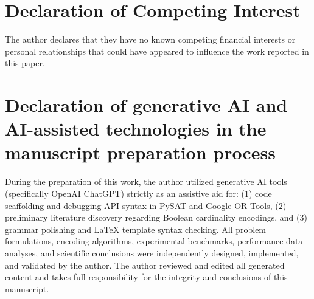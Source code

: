 \documentclass[a4paper,fleqn]{cas-sc}
\begin{document}
\section*{Declaration of Competing Interest}
The author declares that they have no known competing financial interests or personal relationships that could have appeared to influence the work reported in this paper.

\section*{Declaration of generative AI and AI-assisted technologies in the manuscript preparation process}
During the preparation of this work, the author utilized generative AI tools (specifically OpenAI ChatGPT) strictly as an assistive aid for: (1) code scaffolding and debugging API syntax in PySAT and Google OR-Tools, (2) preliminary literature discovery regarding Boolean cardinality encodings, and (3) grammar polishing and \LaTeX{} template syntax checking. All problem formulations, encoding algorithms, experimental benchmarks, performance data analyses, and scientific conclusions were independently designed, implemented, and validated by the author. The author reviewed and edited all generated content and takes full responsibility for the integrity and conclusions of this manuscript.



\end{document}
